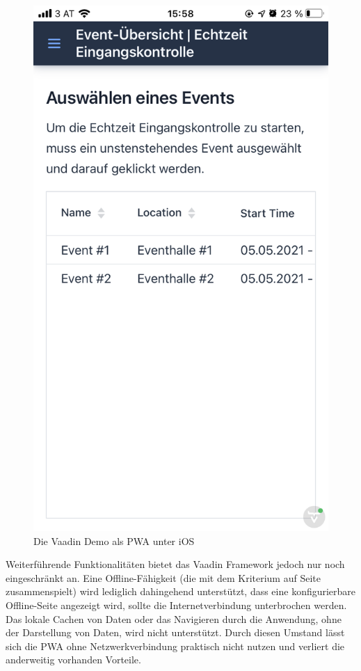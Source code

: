 \documentclass[a4paper,12pt,twoside]{scrreprt}
\begin{document}
\begin{figure}[ht]
    \centering
    \includegraphics[scale=0.25]{images/Luidold_Results-Vaadin-PWA.png}
    \caption[Die Vaadin Demo als \acs{PWA} unter iOS]{Die Vaadin Demo als \ac{PWA} unter iOS}
    \label{fig:results-vaadin-pwa}
\end{figure}

Weiterführende Funktionalitäten bietet das Vaadin Framework jedoch nur noch eingeschränkt an. Eine Offline-Fähigkeit (die mit dem Kriterium \textit{} auf Seite \pageref{sub-sec:kriterien-datenanbindung} zusammenspielt) wird lediglich dahingehend unterstützt, dass eine konfigurierbare Offline-Seite angezeigt wird, sollte die Internetverbindung unterbrochen werden. Das lokale Cachen von Daten oder das Navigieren durch die Anwendung, ohne der Darstellung von Daten, wird nicht unterstützt. Durch diesen Umstand lässt sich die \ac{PWA} ohne Netzwerkverbindung praktisch nicht nutzen und verliert die anderweitig vorhanden Vorteile.
\end{document}

